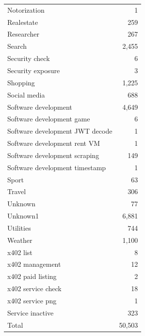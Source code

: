 \begin{table}[htbp]
\begin{tabular}{lr}
    Notorization & 1 \\
    Realestate & 259 \\
    Researcher & 267 \\
    Search & 2,455 \\
    Security check & 6 \\
    Security exposure & 3 \\
    Shopping & 1,225 \\
    Social media & 688 \\
    Software development & 4,649 \\
    Software development game & 6 \\
    Software development JWT decode & 1 \\
    Software development rent VM & 1 \\
    Software development scraping & 149 \\
    Software development timestamp & 1 \\
    Sport & 63 \\
    Travel & 306 \\
    Unknown & 77 \\
    Unknown1 & 6,881 \\
    Utilities & 744 \\
    Weather & 1,100 \\
    x402 list & 8 \\
    x402 management & 12 \\
    x402 paid listing & 2 \\
    x402 service check & 18 \\
    x402 service png & 1 \\
    Service inactive & 323 \\
    \midrule
    Total & 50,503 \\
    \bottomrule
  \end{tabular}
\end{table}
